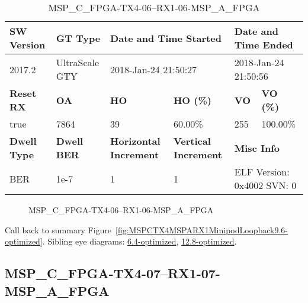 \begin{table}[h]
\centering
\caption{MSP\_C\_FPGA-TX4-06--RX1-06-MSP\_A\_FPGA}
\label{tab:MSPCFPGATX406RX106MSPAFPGA9.6-optimized}
\begin{tabular}{@{}|l|l|l|l|l|l|@{}}
\toprule
\textbf{SW Version}                & \textbf{GT Type}   & \multicolumn{2}{l|}{\textbf{Date and Time Started}}            & \multicolumn{2}{l|}{\textbf{Date and Time Ended}}        \\ \midrule
2017.2                       & UltraScale GTY          & \multicolumn{2}{l|}{2018-Jan-24 21:50:27}                   & \multicolumn{2}{l|}{2018-Jan-24 21:50:56}               \\ \midrule
\textbf{Reset RX}                  & \textbf{OA} & \textbf{HO}   & \textbf{HO (\%)} & \textbf{VO} & \textbf{VO (\%)} \\ \midrule
true & 7864        & 39          & 60.00\%        & 255        & 100.00\%       \\ \midrule
\textbf{Dwell Type}                & \textbf{Dwell BER} & \textbf{Horizontal Increment} & \textbf{Vertical Increment}    & \multicolumn{2}{l|}{\textbf{Misc Info}}                  \\ \midrule
BER                            & 1e-7        & 1        & 1           & \multicolumn{2}{l|}{ELF Version: 0x4002 SVN: 0}                         \\ \bottomrule
\end{tabular}
\end{table}

\begin{figure}[h]
\caption{MSP\_C\_FPGA-TX4-06--RX1-06-MSP\_A\_FPGA} \label{fig:MSPCFPGATX406RX106MSPAFPGA9.6-optimized}
\end{figure}

Call back to summary Figure~\ref{fig:MSPCTX4MSPARX1MinipodLoopback9.6-optimized}.
Sibling eye diagrams: \hyperref[sec:MSPCFPGATX406RX106MSPAFPGA6.4-optimized]{6.4-optimized}, \hyperref[sec:MSPCFPGATX406RX106MSPAFPGA12.8-optimized]{12.8-optimized}.

\clearpage
\newpage


\subsection{MSP\_C\_FPGA-TX4-07--RX1-07-MSP\_A\_FPGA}\label{sec:MSPCFPGATX407RX107MSPAFPGA9.6-optimized}

